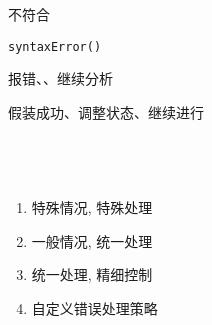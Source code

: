 \begin{frame}{}
  \begin{center}
    \texttt{\bf {}}

    \vspace{0.50cm}

    \vspace{0.30cm}
    不符合
  \end{center}
\end{frame}

\begin{frame}{}
  \begin{center}

    \vspace{0.50cm}
    \texttt{syntaxError()}
  \end{center}
\end{frame}

\begin{frame}{}
  \begin{center}

    \vspace{0.20cm}
    报错、、继续分析
  \end{center}
\end{frame}

\begin{frame}{}

  \vspace{0.30cm}
  \begin{center}
     假装成功、调整状态、继续进行
  \end{center}
\end{frame}

\begin{frame}
  \begin{center}
     \\[10pt]
  \end{center}

  \begin{columns}
      \begin{enumerate}[(1)]
        \setlength{\itemsep}{10pt}
        \item 特殊情况, 特殊处理
        \item 一般情况, 统一处理
        \item 统一处理, 精细控制
        \item 自定义错误处理策略
      \end{enumerate}
  \end{columns}
\end{frame}

